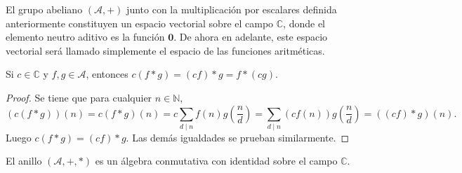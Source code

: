 \begin{proposition}
El grupo abeliano $(\mathcal{A}, +)$ junto con la multiplicación por escalares definida anteriormente constituyen un espacio vectorial sobre el campo $\mathbb{C}$, donde el elemento neutro aditivo es la función $\mathbf{0}$. De ahora en adelante, este espacio vectorial será llamado simplemente el espacio de las funciones aritméticas.
\end{proposition}

\begin{proposition}
Si $c \in \mathbb{C}$ y $f, g \in \mathcal{A}$, entonces $c(f*g)=(c f)*g=f*(c g)$.
\end{proposition}
\begin{proof}
Se tiene que para cualquier $n \in \mathbb{N}$,
\begin{equation*}
    (c(f*g))(n) = c(f*g)(n) = c \sum_{d \mid n} f(n) g \left( \frac{n}{d} \right) = \sum_{d \mid n} (c f(n)) g \left( \frac{n}{d} \right) = ((c f)*g)(n).
\end{equation*}
Luego $c(f*g)=(c f)*g$. Las demás igualdades se prueban similarmente.
\end{proof}

\begin{corollary}\label{cor:est1}
El anillo $(\mathcal{A},+,*)$ es un álgebra conmutativa con identidad sobre el campo $\mathbb{C}$.
\end{corollary}
